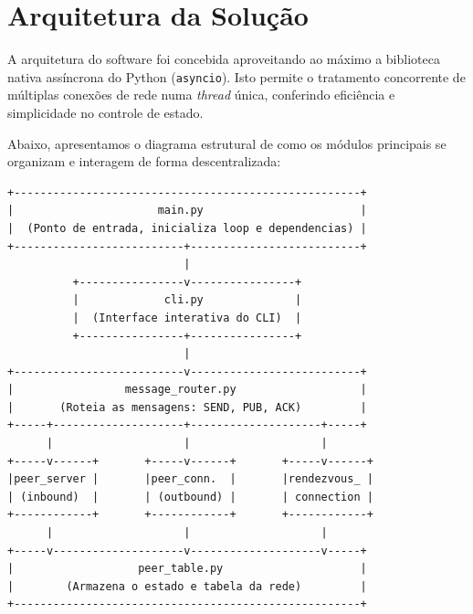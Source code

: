 \documentclass[12pt,a4paper]{article}
\begin{document}
\section{Arquitetura da Solução}
A arquitetura do software foi concebida aproveitando ao máximo a biblioteca nativa assíncrona do Python (\texttt{asyncio}). Isto permite o tratamento concorrente de múltiplas conexões de rede numa \textit{thread} única, conferindo eficiência e simplicidade no controle de estado.


Abaixo, apresentamos o diagrama estrutural de como os módulos principais se organizam e interagem de forma descentralizada:

\begin{lstlisting}[basicstyle=\ttfamily\small, numbers=none]
+-----------------------------------------------------+
|                      main.py                        |
|  (Ponto de entrada, inicializa loop e dependencias) |
+--------------------------+--------------------------+
                           |
          +----------------v----------------+
          |             cli.py              |
          |  (Interface interativa do CLI)  |
          +----------------+----------------+
                           |
+--------------------------v--------------------------+
|                 message_router.py                   |
|       (Roteia as mensagens: SEND, PUB, ACK)         |
+-----+--------------------+--------------------+-----+
      |                    |                    |
+-----v------+       +-----v------+       +-----v------+
|peer_server |       |peer_conn.  |       |rendezvous_ |
| (inbound)  |       | (outbound) |       | connection |
+------------+       +------------+       +------------+
      |                    |                    |
+-----v--------------------v--------------------v-----+
|                   peer_table.py                     |
|        (Armazena o estado e tabela da rede)         |
+-----------------------------------------------------+
\end{lstlisting}
\end{document}
